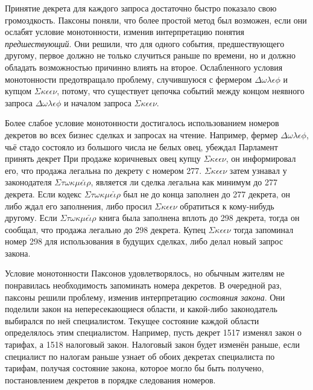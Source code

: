 \documentclass[12pt, a4paper]{article} %
\begin{document}
Принятие декрета для каждого запроса достаточно быстро показало свою громоздкость. Паксоны поняли, что более простой метод был возможен, если они ослабят условие монотонности, изменив интерпретацию понятия \textit{предшествующий}. Они решили, что для одного события, предшествующего другому, первое должно не только случиться раньше по времени, но и должно обладать возможностью причинно влиять на второе. Ослабленного условия монотонности предотвращало проблему, случившуюся с фермером $\Delta\omega\lambda\epsilon\phi$ и купцом $\Sigma\kappa\epsilon\epsilon\nu$, потому, что существует цепочка событий между концом неявного запроса $\Delta\omega\lambda\epsilon\phi$ и началом запроса $\Sigma\kappa\epsilon\epsilon\nu$. 

Более слабое условие монотонности достигалось использованием номеров декретов во всех бизнес сделках и запросах на чтение. Например, фермер $\Delta\omega\lambda\epsilon\phi$, чьё стадо состояло из большого числа не белых овец, убеждал Парламент принять декрет
При продаже коричневых овец купцу $\Sigma\kappa\epsilon\epsilon\nu$, он информировал его, что продажа легальна по декрету с номером 277. $\Sigma\kappa\epsilon\epsilon\nu$ затем узнавал у законодателя $\Sigma\tau\omega\kappa\mu\epsilon\check{\iota}\rho$, является ли сделка легальна как минимум до 277 декрета. Если кодекс $\Sigma\tau\omega\kappa\mu\epsilon\check{\iota}\rho$ был не до конца заполнен до 277 декрета, он либо ждал его заполнения, либо просил  $\Sigma\kappa\epsilon\epsilon\nu$ обратиться к кому-нибудь другому. Если  $\Sigma\tau\omega\kappa\mu\epsilon\check{\iota}\rho$ книга была заполнена вплоть до 298 декрета, тогда он сообщал, что продажа легально до 298 декрета. Купец $\Sigma\kappa\epsilon\epsilon\nu$ тогда запоминал номер 298 для использования в будущих сделках, либо делал новый запрос закона.

Условие монотонности Паксонов удовлетворялось, но обычным жителям не понравилась необходимость запоминать номера декретов. В очередной раз, паксоны решили проблему, изменив интерпретацию \textit{состояния закона}. Они поделили закон на непересекающиеся области, и какой-либо законодатель выбирался по ней специалистом. Текущее состояние каждой области определялось этим специалистом. Например, пусть декрет 1517 изменял закон о тарифах, а 1518 налоговый закон. Налоговый закон будет изменён раньше, если специалист по налогам раньше узнает об обоих декретах специалиста по тарифам, получая состояние закона, которое могло бы быть получено, постановлением декретов в порядке следования номеров.
\end{document}
